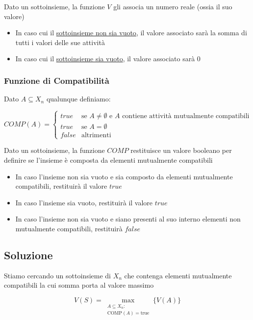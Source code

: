 Dato un sottoinsieme, la funzione $V$ gli associa un numero reale (ossia il suo valore)


\begin{itemize}
    \item In caso cui il \uline{sottoinsieme non sia vuoto}, il valore associato sarà la somma di tutti i valori delle sue attività
    \item In caso cui il \uline{sottoinsieme sia vuoto}, il valore associato sarà 0
\end{itemize}

\newpage
\subsubsection{Funzione di Compatibilità}
Dato $A \subseteq X_n$ qualunque definiamo:

{
    \large
    $$
    COMP(A) = 
    \begin{cases}
        true & \text{se } A \not = \emptyset \text{ e } A \text{ contiene attività mutualmente compatibili} \\
        true & \text{se } A = \emptyset \\
        false & \text{altrimenti}
    \end{cases}
    $$
}

Dato un sottoinsieme, la funzione $COMP$ restituisce un valore booleano per definire se l'insieme è composta da elementi mutualmente compatibili
\begin{itemize}
    \item In caso l'insieme non sia vuoto e sia composto da elementi mutualmente compatibili, restituirà il valore $true$
    \item In caso l'insieme sia vuoto, restituirà il valore $true$
    \item In caso l'insieme non sia vuoto e siano presenti al suo interno elementi non mutualmente compatibili, restituirà $false$
\end{itemize}

\subsection{Soluzione}
Stiamo cercando un sottoinsieme di $X_n$ che contenga elementi mutualmente compatibili la cui somma porta al valore massimo

{
    \large
    \[
        V(S) = \max_{\substack{A \subseteq X_n : \\ \text{COMP}(A)=\text{true}}} \{ V(A) \}
    \]
}

